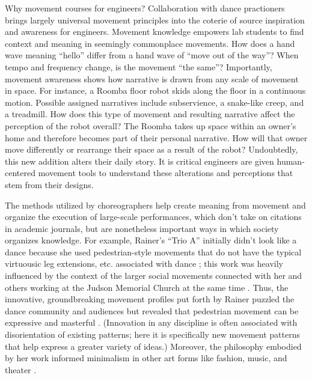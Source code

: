 \documentclass[arts,article,submit,moreauthors,pdftex,10pt,a4paper]{mdpi}
\begin{document}

Why movement courses for engineers?  %
Collaboration with dance practioners brings largely universal movement principles into the coterie of source inspiration and awareness for engineers.  Movement knowledge empowers lab students to find context and meaning in seemingly commonplace movements.  How does a hand wave meaning ``hello'' differ from a hand wave of ``move out of the way''?  When tempo and frequency change, is the movement ``the same''?  Importantly, movement awareness shows how narrative is drawn from any scale of movement in space.  For instance, a Roomba floor robot skids along the floor in a continuous motion.  Possible assigned narratives include subservience, a snake-like creep, and a treadmill.  How does this type of movement and resulting narrative affect the perception of the robot overall?  The Roomba takes up space within an owner’s home and therefore becomes part of their personal narrative.  How will that owner move differently or rearrange their space as a result of the robot?  Undoubtedly, this new addition alters their daily story.  It is critical engineers are given human-centered movement tools to understand these alterations and perceptions that stem from their designs.

The methods utilized by choreographers help create meaning from movement and organize the execution of large-scale performances, which don't take on citations in academic journals, but are nonetheless important ways in which society organizes knowledge.  For example, Rainer's ``Trio A'' initially didn't look like a dance because she used pedestrian-style movements that do not have the typical virtuousic leg extensions, etc. associated with dance \cite{rainer1966quasi,lambert2008being}; this work was heavily influenced by the context of the larger social movements connected with her and others working at the Judson Memorial Church at the same time \cite{banes1983democracy,banes2011terpsichore}.  Thus, the innovative, groundbreaking movement profiles put forth by Rainer puzzled the dance community and audiences but revealed that pedestrian movement can be expressive and masterful \cite{exempli}.  (Innovation in any discipline is often associated with disorientation of existing patterns; here it is specifically new movement patterns that help express a greater variety of ideas.)  Moreover, the philosophy embodied by her work \cite{rainer2006no} informed minimalism in other art forms like fashion, music, and theater \cite{copeland1993dance,lambert1999moving}.
\end{document}
